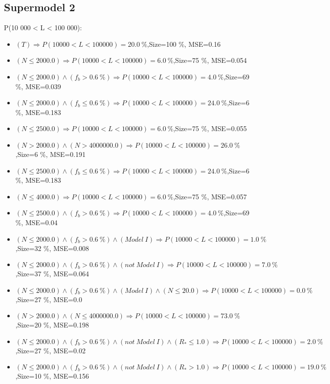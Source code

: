 \documentclass[numbered]{CSL}
\begin{document}
\subsection{Supermodel 2}
P(10 000 < L < 100 000):
\begin{itemize}
\item $(T) \Rightarrow P(10 000 < L < 100 000) = 20.0~\%$,\hfill Size=100 \%, MSE=0.16
\item $(N \leq 2000.0) \Rightarrow P(10 000 < L < 100 000) = 6.0~\%$,\hfill Size=75 \%, MSE=0.054
\item $(N \leq 2000.0) \land (f_b > 0.6~\%) \Rightarrow P(10 000 < L < 100 000) = 4.0~\%$,\hfill Size=69 \%, MSE=0.039
\item $(N \leq 2000.0) \land (f_b \leq 0.6~\%) \Rightarrow P(10 000 < L < 100 000) = 24.0~\%$,\hfill Size=6 \%, MSE=0.183
\item $(N \leq 2500.0) \Rightarrow P(10 000 < L < 100 000) = 6.0~\%$,\hfill Size=75 \%, MSE=0.055
\item $(N > 2000.0) \land (N > 4000000.0) \Rightarrow P(10 000 < L < 100 000) = 26.0~\%$,\hfill Size=6 \%, MSE=0.191
\item $(N \leq 2500.0) \land (f_b \leq 0.6~\%) \Rightarrow P(10 000 < L < 100 000) = 24.0~\%$,\hfill Size=6 \%, MSE=0.183
\item $(N \leq 4000.0) \Rightarrow P(10 000 < L < 100 000) = 6.0~\%$,\hfill Size=75 \%, MSE=0.057
\item $(N \leq 2500.0) \land (f_b > 0.6~\%) \Rightarrow P(10 000 < L < 100 000) = 4.0~\%$,\hfill Size=69 \%, MSE=0.04
\item $(N \leq 2000.0) \land (f_b > 0.6~\%) \land (Model~I) \Rightarrow P(10 000 < L < 100 000) = 1.0~\%$,\hfill Size=32 \%, MSE=0.008
\item $(N \leq 2000.0) \land (f_b > 0.6~\%) \land (not~Model~I) \Rightarrow P(10 000 < L < 100 000) = 7.0~\%$,\hfill Size=37 \%, MSE=0.064
\item $(N \leq 2000.0) \land (f_b > 0.6~\%) \land (Model~I) \land (N \leq 20.0) \Rightarrow P(10 000 < L < 100 000) = 0.0~\%$,\hfill Size=27 \%, MSE=0.0
\item $(N > 2000.0) \land (N \leq 4000000.0) \Rightarrow P(10 000 < L < 100 000) = 73.0~\%$,\hfill Size=20 \%, MSE=0.198
\item $(N \leq 2000.0) \land (f_b > 0.6~\%) \land (not~Model~I) \land (R_* \leq 1.0) \Rightarrow P(10 000 < L < 100 000) = 2.0~\%$,\hfill Size=27 \%, MSE=0.02
\item $(N \leq 2000.0) \land (f_b > 0.6~\%) \land (not~Model~I) \land (R_* > 1.0) \Rightarrow P(10 000 < L < 100 000) = 19.0~\%$,\hfill Size=10 \%, MSE=0.156

\end{itemize}
\end{document}
